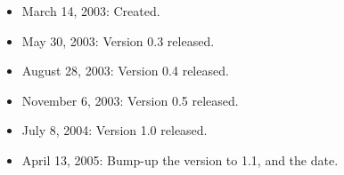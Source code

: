 \documentclass[11pt]{article}
\begin{document}
\begin{itemize}

  \item March 14, 2003: Created.

  \item May 30, 2003: Version 0.3 released.

  \item August 28, 2003: Version 0.4 released.

  \item November 6, 2003: Version 0.5 released.

  \item July 8, 2004: Version 1.0 released.

  \item April 13, 2005: Bump-up the version to 1.1, and the date.

\end{itemize}




\end{document}
